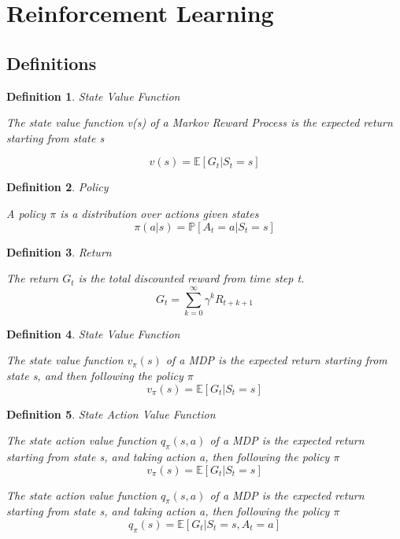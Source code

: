 \documentclass[12pt,a4paper]{article}
\newtheorem{definition}{Definition}
\begin{document}
\section{Reinforcement Learning}

\subsection{Definitions}

\begin{definition}{State Value Function}

The state value function v(s) of a Markov Reward Process is the expected return starting from state s

\[ 
v(s) = \mathbb{E}[G_{t} \vert S_{t}=s]
\]
\end{definition}

\begin{definition}{Policy}

A policy $\pi$ is a distribution over actions given states
\[ 
\pi(a\vert s) = \mathbb{P}[A_{t}=a \vert S_{t}=s]
\]
\end{definition}

\begin{definition}{Return}

The return $G_{t}$ is the total discounted reward from time step t.
\[ 
G_{t} = \sum_{k=0}^{\infty}{\gamma^{k}R_{t+k+1}}
\]
\end{definition}

\begin{definition}{State Value Function}

The state value function $v_{\pi}(s)$ of a MDP is the expected return starting from state s, and then following the policy $\pi$
\[ 
v_{\pi}(s) = \mathbb{E}[G_{t} \vert S_{t}=s]
\]
\end{definition}

\begin{definition}{State Action Value Function}

The state action value function $q_{\pi}(s, a)$ of a MDP is the expected return starting from state s, and taking action a, then following the policy $\pi$
\[ 
v_{\pi}(s) = \mathbb{E}[G_{t} \vert S_{t}=s]
\]

The state action value function $q_{\pi}(s, a)$ of a MDP is the expected return starting from state s, and taking action a, then following the policy $\pi$
\[ 
q_{\pi}(s) = \mathbb{E}[G_{t} \vert S_{t}=s, A_{t}=a]
\]

\end{definition}
\end{document}
